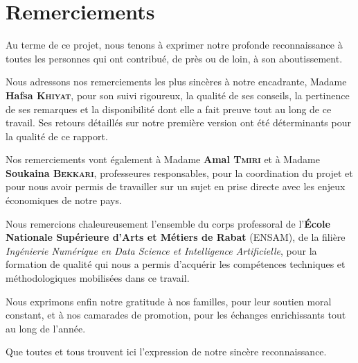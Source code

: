 \chapter*{Remerciements}
\thispagestyle{plain}

Au terme de ce projet, nous tenons à exprimer notre profonde reconnaissance à toutes les personnes qui ont contribué, de près ou de loin, à son aboutissement.

Nous adressons nos remerciements les plus sincères à notre encadrante, Madame \textbf{Hafsa \textsc{Khiyat}}, pour son suivi rigoureux, la qualité de ses conseils, la pertinence de ses remarques et la disponibilité dont elle a fait preuve tout au long de ce travail. Ses retours détaillés sur notre première version ont été déterminants pour la qualité de ce rapport.

Nos remerciements vont également à Madame \textbf{Amal \textsc{Tmiri}} et à Madame \textbf{Soukaina \textsc{Bekkari}}, professeures responsables, pour la coordination du projet et pour nous avoir permis de travailler sur un sujet en prise directe avec les enjeux économiques de notre pays.

Nous remercions chaleureusement l'ensemble du corps professoral de l'\textbf{École Nationale Supérieure d'Arts et Métiers de Rabat} (ENSAM), de la filière \textit{Ingénierie Numérique en Data Science et Intelligence Artificielle}, pour la formation de qualité qui nous a permis d'acquérir les compétences techniques et méthodologiques mobilisées dans ce travail.

Nous exprimons enfin notre gratitude à nos familles, pour leur soutien moral constant, et à nos camarades de promotion, pour les échanges enrichissants tout au long de l'année.

Que toutes et tous trouvent ici l'expression de notre sincère reconnaissance.
